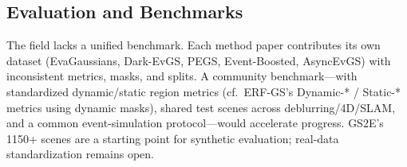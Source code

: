 \subsection{Evaluation and Benchmarks}
\label{sec:disc:benchmarks}

The field lacks a unified benchmark. Each method paper contributes its own dataset (EvaGaussians, Dark-EvGS, PEGS, Event-Boosted, AsyncEvGS) with inconsistent metrics, masks, and splits. A community benchmark---with standardized dynamic/static region metrics (cf.\ ERF-GS's Dynamic-* / Static-* metrics using dynamic masks), shared test scenes across deblurring/4D/SLAM, and a common event-simulation protocol---would accelerate progress. GS2E's 1150+ scenes are a starting point for synthetic evaluation; real-data standardization remains open.
